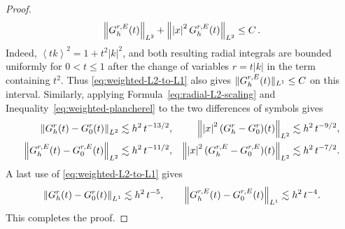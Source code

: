 \documentclass[10pt,a4paper]{amsart}
\newcommand		{\Gr}			{G^{\textnormal{r}}}
\newcommand		{\GrE}			{G^{\textnormal{r},E}}
\newcommand		{\Nrm}[2]		{\nrm{#1}_{#2}}
\newcommand		{\bangle}[1]	{\lt\langle #1\rt\rangle}
\newcommand	{\h}			{h}
\newcommand		{\lt}			{\left}				%
\newcommand		{\n}[1]			{\lt\lvert{#1}\rt\rvert}	%
\newcommand		{\nrm}[1]		{\lt\lVert{#1}\rt\rVert}		%
\newcommand		{\rt}			{\right}			%
\newcommand		{\sNrm}[2]		{\snrm{#1}_{#2}}
\newcommand		{\snrm}[1]		{\lVert #1\rVert}
\newcommand		{\weight}[1]	{\bangle{#1}}	%
\begin{document}
\begin{proof}
		\begin{equation*}
			\Nrm{\GrE_\h(t)}{L^2} + \Nrm{\n{x}^2\GrE_\h(t)}{L^2}\leq C \, .
		\end{equation*}
		Indeed, $\weight{t k}^2 = 1+t^2\n{k}^2$, and both resulting radial integrals are bounded uniformly for $0<t\leq1$ after the change of variables $r=t\n{k}$ in the term containing $t^2$. Thus \eqref{eq:weighted-L2-to-L1} also gives $\sNrm{\GrE_\h(t)}{L^1}\leq C$ on this interval. Similarly, applying Formula~\eqref{eq:radial-L2-scaling} and Inequality~\eqref{eq:weighted-plancherel} to the two differences of symbols gives
		\begin{align*}
			\Nrm{\Gr_\h(t)-\Gr_0(t)}{L^2} &\lesssim \h^2 \, t^{-13/2},
			&\Nrm{\n{x}^2(\Gr_\h-\Gr_0)(t)}{L^2} &\lesssim \h^2 \, t^{-9/2},
			\\
			\Nrm{\GrE_\h(t)-\GrE_0(t)}{L^2} &\lesssim \h^2 \, t^{-11/2},
			&\Nrm{\n{x}^2(\GrE_\h-\GrE_0)(t)}{L^2} &\lesssim \h^2 \, t^{-7/2}.
		\end{align*}
		A last use of \eqref{eq:weighted-L2-to-L1} gives
		\begin{equation*}
			\Nrm{\Gr_\h(t)-\Gr_0(t)}{L^1} \lesssim \h^2 \, t^{-5},
			\qquad
			\Nrm{\GrE_\h(t)-\GrE_0(t)}{L^1} \lesssim \h^2 \, t^{-4}.
		\end{equation*}
		This completes the proof.
	\end{proof}
\end{document}
